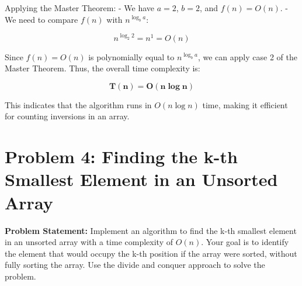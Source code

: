 \documentclass[a4paper,12pt]{report}
\begin{document}
Applying the Master Theorem:
- We have \(a = 2\), \(b = 2\), and \(f(n) = O(n)\).
- We need to compare \(f(n)\) with \(n^{\log_b a}\):
  
  \[
  n^{\log_2 2} = n^1 = O(n)
  \]

Since \(f(n) = O(n)\) is polynomially equal to \(n^{\log_b a}\), we can apply case 2 of the Master Theorem. Thus, the overall time complexity is:

\begin{tcolorbox}[colback=white, colframe=black, boxrule=0.5pt] %
\[
\mathbf{T(n) = O(n \log n)}
\]
\end{tcolorbox}

This indicates that the algorithm runs in \(O(n \log n)\) time, making it efficient for counting inversions in an array.



\vspace{250pt}
\section*{Problem 4: Finding the k-th Smallest Element in an Unsorted Array}

\textbf{Problem Statement:}   Implement an algorithm to find the k-th smallest element in an unsorted array with a time complexity of \(O(n)\). Your goal is to identify the element that would occupy the k-th position if the array were sorted, without fully sorting the array. Use the divide and conquer approach to solve the problem.
\end{document}
